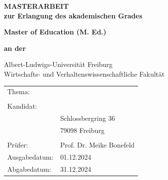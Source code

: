 \thispagestyle{empty}
{
	\setlength{\parskip}{1cm}
	\begin{center}
		\vspace*{1cm}
		\textbf{\Huge MASTERARBEIT}
		\vspace{2cm}\\
		
		\textbf{zur Erlangung des akademischen Grades}
		
		\textbf{\Large Master of Education (M. Ed.)}
		
		\textbf{an der}
		
		{\huge Albert-Ludwigs-Universität Freiburg}\\
		
		{\Large Wirtschafts- und Verhaltenswissenschaftliche Fakultät}
		\vspace{1cm}
		
		\renewcommand{\arraystretch}{1.0}	%
		\begin{tabular}{p{4cm} p{10cm}}
			Thema: & \thetitle \\&\\
			Kandidat: & \theauthor \\
			& Schlossbergring 36 \\
			& 79098 Freiburg \\&\\
			Prüfer: & Prof. Dr. Meike Bonefeld \\
			Ausgabedatum: & 01.12.2024 \\
			Abgabedatum: & 31.12.2024 \\
		\end{tabular}
		\renewcommand{\arraystretch}{1.5}	%
	\end{center}
}
\newpage



